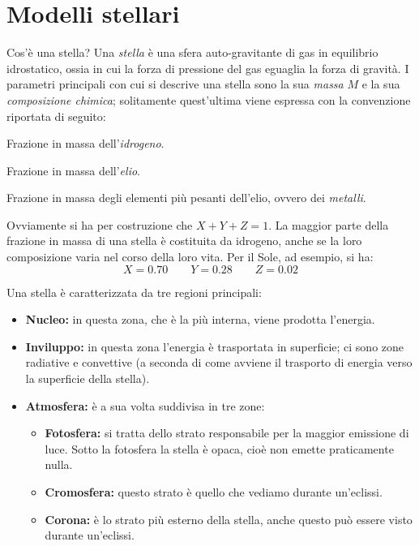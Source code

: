 \section{Modelli stellari}\label{sec:modelli-stellari}
Cos'è una stella? Una \emph{stella} è una sfera auto-gravitante di gas in equilibrio idrostatico, ossia in cui la forza di pressione del gas eguaglia la forza di gravità. I parametri principali con cui si descrive una stella sono la sua \emph{massa} $M$ e la sua \emph{composizione chimica}; solitamente quest'ultima viene espressa con la convenzione riportata di seguito:
\begin{description}\label{tab:composizione-chimica}
    \item[X] Frazione in massa dell'\emph{idrogeno}.
    \item[Y] Frazione in massa dell'\emph{elio}.
    \item[Z] Frazione in massa degli elementi più pesanti dell'elio, ovvero dei \emph{metalli}.
\end{description}
Ovviamente si ha per costruzione che $X + Y + Z = 1$. La maggior parte della frazione in massa di una stella è costituita da idrogeno, anche se la loro composizione varia nel corso della loro vita. Per il Sole, ad esempio, si ha:
\[
    X=0.70 \qquad Y=0.28 \qquad Z=0.02
\]

Una stella è caratterizzata da tre regioni principali:
\begin{itemize}
    \item \textbf{Nucleo:} in questa zona, che è la più interna, viene prodotta l'energia.
    \item \textbf{Inviluppo:} in questa zona l'energia è trasportata in superficie; ci sono zone radiative e convettive (a seconda di come avviene il trasporto di energia verso la superficie della stella).
    \item \textbf{Atmosfera:} è a sua volta suddivisa in tre zone:
    \begin{itemize}
        \item \textbf{Fotosfera:} si tratta dello strato responsabile per la maggior emissione di luce. Sotto la fotosfera la stella è opaca, cioè non emette praticamente nulla.
        \item \textbf{Cromosfera:} questo strato è quello che vediamo durante un'eclissi.
        \item \textbf{Corona:} è lo strato più esterno della stella, anche questo può essere visto durante un'eclissi.
    \end{itemize}
\end{itemize}

